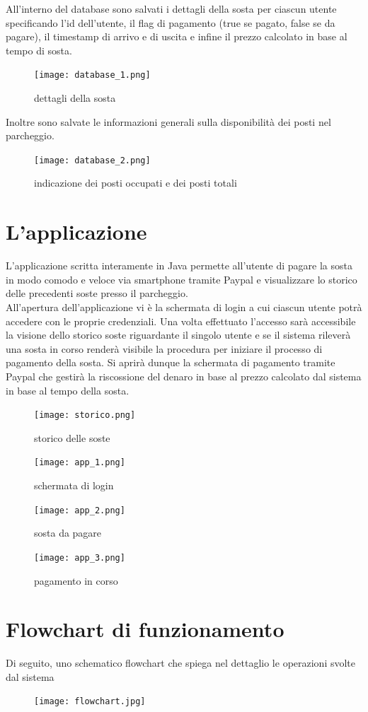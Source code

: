\documentclass[a4paper,titlepage]{report}
\begin{document}
All'interno del database sono salvati i dettagli della sosta per ciascun utente specificando l'id dell'utente, il flag di pagamento (true se pagato, false se da pagare), il timestamp di arrivo e di uscita e infine il prezzo calcolato in base al tempo di sosta.
\begin{figure}[h]
\centering
\texttt{[image: database\_1.png]}
\caption{dettagli della sosta}
\end{figure}

Inoltre sono salvate le informazioni generali sulla disponibilità dei posti nel parcheggio.
\begin{figure}[h]
\centering
\texttt{[image: database\_2.png]}
\caption{indicazione dei posti occupati e dei posti totali}
\end{figure}
\newpage
\section*{L'applicazione}
L'applicazione scritta interamente in Java permette all'utente di pagare la sosta in modo comodo e veloce via smartphone tramite Paypal e visualizzare lo storico delle precedenti soste presso il parcheggio.\\
All'apertura dell'applicazione vi è la schermata di login a cui ciascun utente potrà accedere con le proprie credenziali. Una volta effettuato l'accesso sarà accessibile la visione dello storico soste riguardante il singolo utente e se il sistema rileverà una sosta in corso renderà visibile la procedura per iniziare il processo di pagamento della sosta. Si aprirà dunque la schermata di pagamento tramite Paypal che gestirà la riscossione del denaro in base al prezzo calcolato dal sistema in base al tempo della sosta.

\begin{figure}[h]
\centering
\texttt{[image: storico.png]}
\caption{storico delle soste}
\end{figure}

\begin{figure}[!htb]
  \texttt{[image: app\_1.png]}
  \caption{schermata di login}
\endminipage\hfill
{}
  \texttt{[image: app\_2.png]}
  \caption{sosta da pagare}
\endminipage\hfill
{}%
  \texttt{[image: app\_3.png]}
  \caption{pagamento in corso}
\endminipage
\end{figure}

\newpage
\section{Flowchart di funzionamento}
Di seguito, uno schematico flowchart che spiega nel dettaglio le operazioni svolte dal sistema
\begin{figure}[h]
\centering
\hspace*{-1.5in}
\texttt{[image: flowchart.jpg]}
\end{figure}
\end{document}
